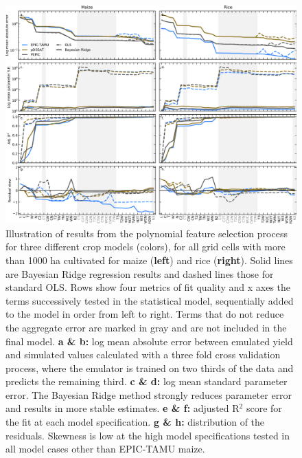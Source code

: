 \documentclass[gmd, manuscript]{copernicus} %
\begin{document}
\begin{figure}[ht]
\centering
   \includegraphics[width=16.3cm]{figures/model_select_maize_rice.png}
	\caption{
    Illustration of results from the polynomial feature selection process for three different crop models (colors), for all grid cells with more than 1000 ha cultivated for maize (\textbf{left}) and rice (\textbf{right}). 
    Solid lines are Bayesian Ridge regression results and dashed lines those for standard OLS. Rows show four metrics of fit quality and x axes the terms successively tested in the statistical model, sequentially added to the model in order from left to right.
    Terms that do not reduce the aggregate error are marked in {\color{dark-gray} gray} and are not included in the final model. 
    \textbf{a \& b:} log mean absolute error between emulated yield and simulated values calculated with a three fold cross validation process, where the emulator is trained on two thirds of the data and predicts the remaining third.
    \textbf{c \& d:} log mean standard parameter error. The Bayesian Ridge method strongly reduces parameter error and results in more stable estimates. 
    \textbf{e \& f:} adjusted R$^2$ score for the fit at each model specification. 
	\textbf{g \& h:} distribution of the residuals. Skewness is low at the high model specifications tested in all model cases other than EPIC-TAMU maize.
	}
   \label{fig:features}
\end{figure}
\end{document}
